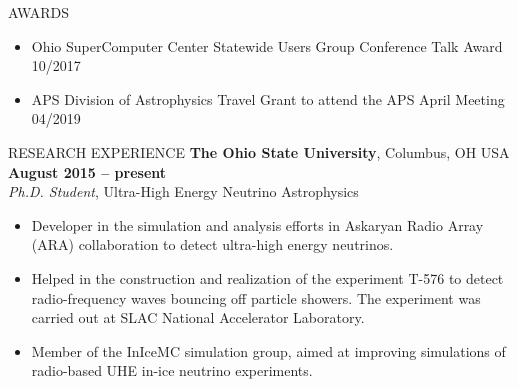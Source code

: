 \documentclass{resume} %
\begin{document}
\begin{rSection}{AWARDS}
 \begin{itemize}
 \item Ohio SuperComputer Center Statewide Users Group Conference Talk Award \hfill 10/2017
 \item APS Division of Astrophysics Travel Grant to attend the APS April Meeting \hfill 04/2019

 \end{itemize}
\end{rSection}

\begin{rSection}{RESEARCH EXPERIENCE}
{\bf The Ohio State University}, Columbus, OH USA \hfill {\bf August 2015 -- present} \\
 {\em Ph.D. Student}, Ultra-High Energy Neutrino Astrophysics
\begin{itemize}
\vspace*{.05in}
\item Developer in the simulation and analysis efforts in Askaryan Radio Array (ARA) collaboration to detect ultra-high energy neutrinos.
\item Helped in the construction and realization of the experiment T-576 to detect radio-frequency waves bouncing off particle showers. The experiment was carried out at SLAC National Accelerator Laboratory.
\item Member of the InIceMC simulation group, aimed at improving simulations of radio-based UHE in-ice neutrino experiments. 

\end{itemize}

\end{rSection}
\end{document}
